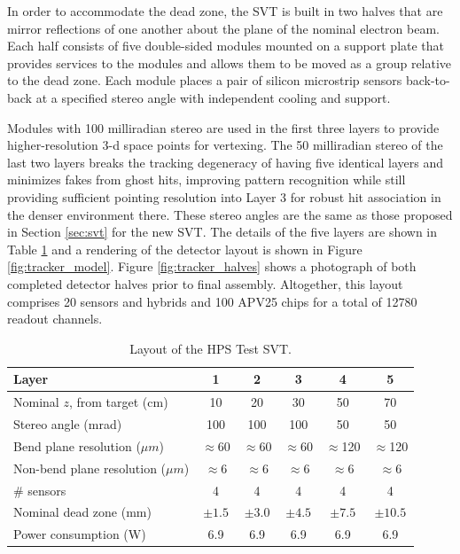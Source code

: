 In order to accommodate the dead zone, the SVT is built in two halves that are mirror reflections of one another about the plane of the nominal electron beam.  Each half consists of five double-sided modules mounted on a support plate that provides services to the modules and allows them to be moved as a group relative to the dead zone. Each module places a pair of silicon microstrip sensors back-to-back at a specified stereo angle with independent cooling and support.

Modules with 100 milliradian stereo are used in the first three layers to provide higher-resolution 3-d space points for vertexing. The 50 milliradian stereo of the last two layers breaks the tracking degeneracy of having five identical layers and minimizes fakes from ghost hits, improving pattern recognition while still providing sufficient pointing resolution into Layer 3 for robust hit association in the denser environment there. These stereo angles are the same as those proposed in Section \ref{sec:svt} for the new SVT. The details of the five layers are shown in Table \ref{tab:trk} and a rendering of the detector layout is shown in Figure \ref{fig:tracker_model}.  Figure \ref{fig:tracker_halves} shows a photograph of both completed detector halves prior to final assembly.  Altogether, this layout comprises 20 sensors and hybrids and 100 APV25 chips for a total of 12780 readout channels. 

\begin{table}[h]
\begin{center}
\begin{tabular}{lccccc}   
\hline \hline 
    Layer & 1 & 2 & 3 & 4 & 5 \\      
\hline
    Nominal $z$, from target (cm)  & 10 & 20 & 30 & 50 & 70  \\ 
    Stereo angle (mrad)  & 100 & 100 & 100 & 50 & 50 \\ 
    Bend plane resolution ($\mu m$)  & $\approx$60 & $\approx$60 & $\approx$60 & $\approx$120 & $\approx$120  \\ 
    Non-bend plane resolution ($\mu m$)  & $\approx$6 & $\approx$6 & $\approx$6 & $\approx$6 & $\approx$6  \\ 
    \# sensors  & 4 & 4 & 4 & 4 & 4  \\ 
    Nominal dead zone (mm)  & $\pm1.5$  & $\pm3.0$  & $\pm4.5$  & $\pm7.5$  & $\pm10.5$  \\ 
    Power consumption (W) & 6.9 & 6.9 & 6.9 & 6.9 & 6.9 \\
\hline \hline
\end{tabular}
\caption[]{Layout of the HPS Test SVT. }
\label{tab:trk} 
\end{center}
\end{table}

